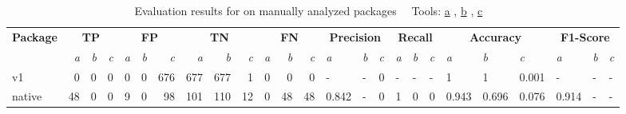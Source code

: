 \begin{table}[htp!]
    \centering
    \caption[Evaluation results for \toolSafer{} on manually analyzed packages]
        {Evaluation results for \toolSafer{} on manually analyzed packages~\newline \tiny ~\newline \footnotesize
        Tools: \underline{a} \toolSafer{}, \underline{b} \toolVet{}, \underline{c} \toolGosec{} \tiny ~\newline}
    \label{tbl:go-safer-evaluation-packages}
    \begin{adjustbox}{max width=\textwidth}
        \begin{tabular}{l||rrr|rrr|rrr|rrr||lll|lll|lll|lll}
            \textbf{Package} & \multicolumn{3}{c|}{\textbf{TP}}                & \multicolumn{3}{c|}{\textbf{FP}}                   & \multicolumn{3}{c|}{\textbf{TN}}                    & \multicolumn{3}{c||}{\textbf{FN}}                  & \multicolumn{3}{c|}{\textbf{Precision}}  & \multicolumn{3}{c|}{\textbf{Recall}}    & \multicolumn{3}{c|}{\textbf{Accuracy}}           & \multicolumn{3}{c}{\textbf{F1-Score}}    \\
            {}               & \textit{a}            & \textit{b} & \textit{c} & \textit{a}             & \textit{b} & \textit{c}   & \textit{a}            & \textit{b}   & \textit{c}   & \textit{a}             & \textit{b}  & \textit{c}  & \textit{a}     & \textit{b} & \textit{c} & \textit{a}    & \textit{b} & \textit{c} & \textit{a}     & \textit{b}     & \textit{c}     & \textit{a}     & \textit{b} & \textit{c} \\
            \hline
            v1               & 0                     & 0          & 0          & 0                      & 0          & 676          & 677                   & 677          & 1            & 0                      & 0           & 0           & -              & -          & 0          & -             & -          & -          & 1              & 1              & 0.001          & -              & -          & -          \\
            \rowcolor{verylightgray}
            native           & 48                    & 0          & 0          & 9                      & 0          & 98           & 101                   & 110          & 12           & 0                      & 48          & 48          & 0.842          & -          & 0          & 1             & 0          & 0          & 0.943          & 0.696          & 0.076          & 0.914          & -          & -          \\

\end{tabular}
\end{adjustbox}
\end{table}
